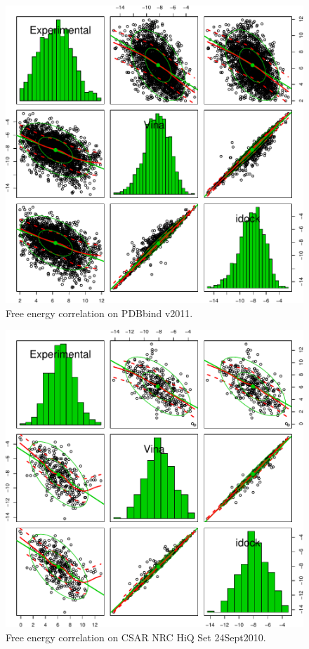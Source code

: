 \documentclass[10pt,conference,compsocconf]{../IEEEtran}
\begin{document}
\begin{figure}
\centering
\includegraphics[width=\linewidth]{PDBbindFECorrelation.pdf}
\caption{Free energy correlation on PDBbind v2011.}
\label{PDBbindFECorrelation}
\end{figure}

\begin{figure}
\centering
\includegraphics[width=\linewidth]{CSARFECorrelation.pdf}
\caption{Free energy correlation on CSAR NRC HiQ Set 24Sept2010.}
\label{PDBbindFECorrelation}
\end{figure}
\end{document}
